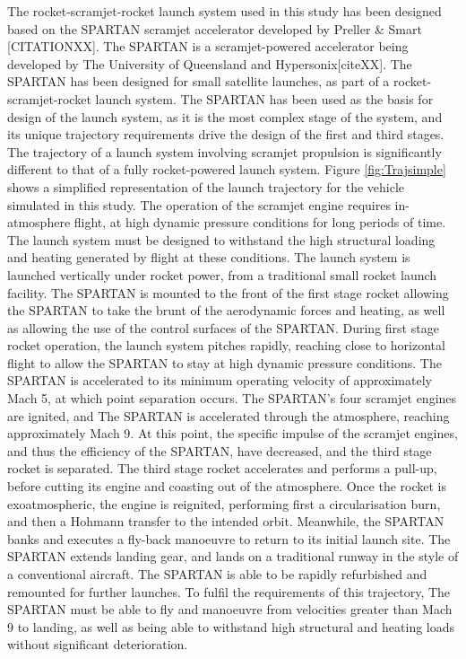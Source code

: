  The rocket-scramjet-rocket launch system used in this study has been designed based on the SPARTAN scramjet accelerator developed by Preller \& Smart [CITATIONXX]. The SPARTAN is a scramjet-powered accelerator being developed by The University of Queensland and Hypersonix[citeXX]. The SPARTAN has been designed for small satellite launches, as part of a rocket-scramjet-rocket launch system.
 The SPARTAN has been used as the basis for design of the launch system, as it is the most complex stage of the system, and its unique trajectory requirements drive the design of the first and third stages.
 The trajectory of a launch system involving scramjet propulsion is significantly different to that of a fully rocket-powered launch system. Figure \ref{fig:Trajsimple} shows a simplified representation of the launch trajectory for the vehicle simulated in this study. The operation of the scramjet engine requires in-atmosphere flight, at high dynamic pressure conditions for long periods of time. The launch system must be designed to withstand the high structural loading and heating generated by flight at these conditions. 
 The launch system is launched vertically under rocket power, from a traditional small rocket launch facility. The SPARTAN is mounted to the front of the first stage rocket allowing the SPARTAN to take the brunt of the aerodynamic forces and heating, as well as allowing the use of the control surfaces of the SPARTAN. During first stage rocket operation, the launch system pitches rapidly, reaching close to horizontal flight to allow the SPARTAN to stay at high dynamic pressure conditions. The SPARTAN is accelerated to its minimum operating velocity of approximately Mach 5, at which point separation occurs. The SPARTAN's four scramjet engines are ignited, and The SPARTAN is accelerated through the atmosphere, reaching approximately Mach 9. At this point, the specific impulse of the scramjet engines, and thus the efficiency of the SPARTAN, have decreased, and the third stage rocket is separated. The third stage rocket accelerates and performs a pull-up, before cutting its engine and coasting out of the atmosphere. Once the rocket is exoatmospheric, the engine is reignited, performing first a circularisation burn, and then a Hohmann transfer to the intended orbit. Meanwhile, the SPARTAN banks and executes a fly-back manoeuvre to return to its initial launch site. The SPARTAN extends landing gear, and lands on a traditional runway in the style of a conventional aircraft. The SPARTAN is able to be rapidly refurbished and remounted for further launches. To fulfil the requirements of this trajectory, The SPARTAN must be able to fly and manoeuvre from velocities greater than Mach 9 to landing, as well as being able to withstand high structural and heating loads without significant deterioration.
 
